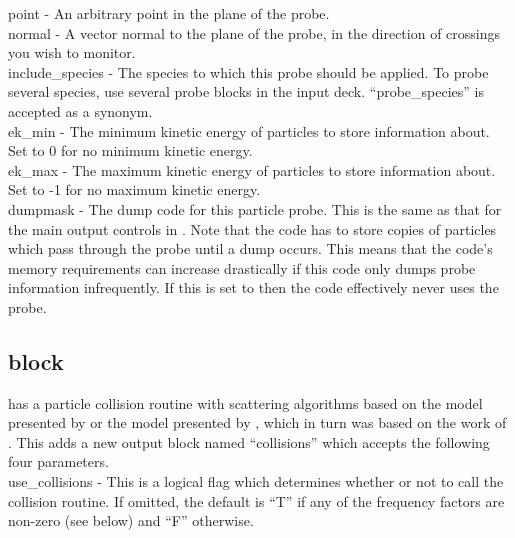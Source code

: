 {\emphtext point} - An arbitrary point in the plane of the probe.\\

{\emphtext normal} - A vector normal to the plane of the probe, in the direction
  of crossings you wish to monitor.\\

{\emphtext include\_species} - The species to which this probe should be
  applied. To probe several species, use several probe blocks in the input
  deck. ``probe\_species'' is accepted as a synonym.\\

{\emphtext ek\_min} - The minimum kinetic energy of particles to store
  information about. Set to 0 for no minimum kinetic energy.\\

{\emphtext ek\_max} - The maximum kinetic energy of particles to store
  information about. Set to -1 for no maximum kinetic energy.\\

{\emphtext dumpmask} - The dump code for this particle probe. This is the same
  as that for the main output controls in . Note that
  the code has to store copies of particles which pass through the probe until
  a dump occurs. This means that the code's memory requirements can increase
  drastically if this code only dumps probe information infrequently. If this
  is set to  then the code effectively never uses the probe.\\


\subsection{\texorpdfstring
  { block}
  {           {collisions} block}}
\label{sec:collisions_block}
{\EPOCH} has a particle collision routine with scattering algorithms based on
the model presented by \citet{Sentoku} or the model presented by
\citet{Perez}, which in turn was based on the work of \citet{Nanbu}.
This adds a new output block named ``collisions'' which accepts the
following four parameters.\\

{\emphtext use\_collisions} - This is a logical flag which determines whether
  or not to call the collision routine. If omitted, the default is ``T'' if any
  of the frequency factors are non-zero (see below) and ``F'' otherwise.\\

